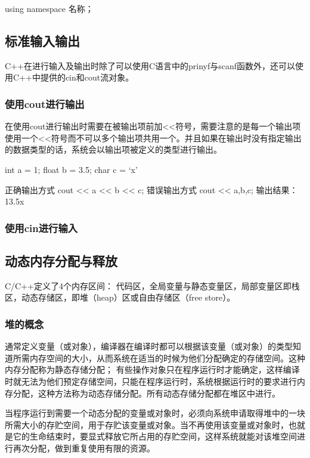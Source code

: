 \begin{Code}
using namespace 名称；
\end{Code}

\subsection{标准输入输出}
C++在进行输入及输出时除了可以使用C语言中的prinyf与scanf函数外，还可以使用C++中提供的cin和cout流对象。

\subsubsection{使用cout进行输出}
在使用cout进行输出时需要在被输出项前加<<符号，需要注意的是每一个输出项使用一个<<符号而不可以多个输出项共用一个。并且如果在输出时没有指定输出的数据类型的话，系统会以输出项被定义的类型进行输出。


\begin{Code}
int a = 1;
float b = 3.5;
char c = ‘x’

正确输出方式 cout << a << b << c;
错误输出方式 cout << a,b,c;
输出结果：13.5x
\end{Code}

\subsubsection{使用cin进行输入}



\subsection{动态内存分配与释放}
C/C++定义了4个内存区间：
代码区，全局变量与静态变量区，局部变量区即栈区，动态存储区，即堆（heap）区或自由存储区（free store）。

\subsubsection{堆的概念}
通常定义变量（或对象），编译器在编译时都可以根据该变量（或对象）的类型知道所需内存空间的大小，从而系统在适当的时候为他们分配确定的存储空间。这种内存分配称为静态存储分配；
有些操作对象只在程序运行时才能确定，这样编译时就无法为他们预定存储空间，只能在程序运行时，系统根据运行时的要求进行内存分配，这种方法称为动态存储分配。所有动态存储分配都在堆区中进行。

当程序运行到需要一个动态分配的变量或对象时，必须向系统申请取得堆中的一块所需大小的存贮空间，用于存贮该变量或对象。当不再使用该变量或对象时，也就是它的生命结束时，要显式释放它所占用的存贮空间，这样系统就能对该堆空间进行再次分配，做到重复使用有限的资源。
